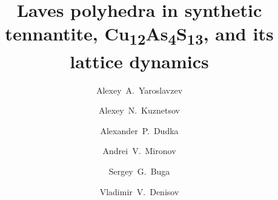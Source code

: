\documentclass[preprint,review,12pt]{elsarticle}
\begin{document}
\begin{frontmatter}



\title{Laves polyhedra in synthetic tennantite, Cu\textsubscript{12}As\textsubscript{4}S\textsubscript{13}, and its lattice dynamics}

\author[TISNCM]{Alexey~A.~Yaroslavzev}
\author[MSU,ICRAS]{Alexey~N.~Kuznetsov}
\author[SIC]{Alexander~P.~Dudka}
\author[MSU]{Andrei~V.~Mironov}
\author[MIPT,TISNCM]{Sergey~G.~Buga}
\author[TISNCM]{Vladimir~V.~Denisov}

\address[TISNCM]{Technological Institute for Superhard and Novel Carbon Materials, 108840, Troitsk, Moscow, Russia}
\address[MSU]{Department of Chemistry, Lomonosov Moscow State University, 119991, Moscow, Russia}
\address[ICRAS]{Kurnakov Institute of General and Inorganic Chemistry RAS, 119991, Moscow, Russia}
\address[SIC]{Shubnikov Institute of Crystallography of Federal Scientific Research Centre “Crystallography and Photonics” of Russian Academy of Sciences, Leninskiy Prospekt 59, 119333, Moscow, Russia}
\address[MIPT]{Moscow Institute of Physics and Technology, 141700, 9 Institutsky lane, Dolgoprudny, Russia}



\end{frontmatter}
\end{document}
